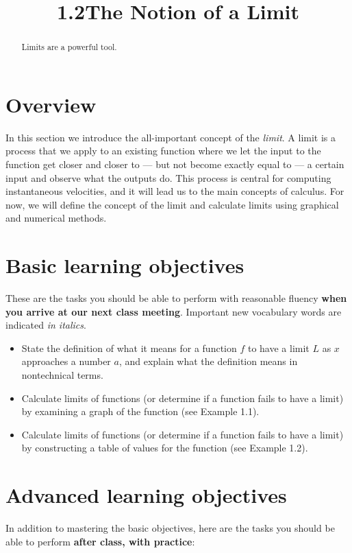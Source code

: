 \documentclass{ximera}
\title{1.2The Notion of a Limit}
\begin{document}
\begin{abstract}
Limits are a powerful tool.
\end{abstract}
\maketitle

\section{Overview}

In this section we introduce the all-important concept of the \emph{limit}. A limit is a process that we apply to an existing function where we let the input to the function get closer and closer to --- but not become exactly equal to --- a certain input and observe what the outputs do. This process is central for computing instantaneous velocities, and it will lead us to the main concepts of calculus. For now, we will define the concept of the limit and calculate limits using graphical and numerical methods.


\section{Basic learning objectives}

These are the tasks you should be able to perform with reasonable fluency \textbf{when you arrive at our next class meeting}. Important new vocabulary words are indicated \emph{in italics}. 

\begin{itemize}
	\item State the definition of what it means for a function $f$ to have a limit $L$ as $x$ approaches a number $a$, and explain what the definition means in nontechnical terms. 
	\item Calculate limits of functions (or determine if a function fails to have a limit) by examining a graph of the function (see Example 1.1).
	\item Calculate limits of functions (or determine if a function fails to have a limit) by constructing a table of values for the function (see Example 1.2).
\end{itemize}

\section{Advanced learning objectives}

In addition to mastering the basic objectives, here are the tasks you should be able to perform \textbf{after class, with practice}: 
\end{document}
